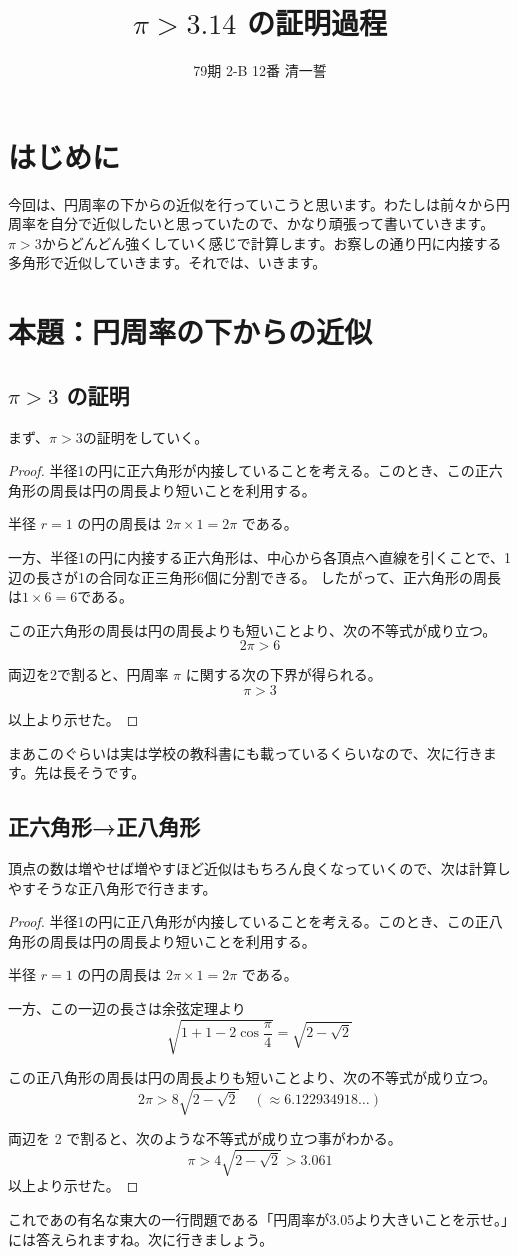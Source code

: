 \documentclass[dvipdfmx]{jlreq}
\title{$\pi > 3.14$ の証明過程}
\author{79期 2-B 12番 \CID{13748}清一誓}
\date{}
\begin{document}
\maketitle
\section{はじめに}
今回は、円周率の下からの近似を行っていこうと思います。わたしは前々から円周率を自分で近似したいと思っていたので、かなり頑張って書いていきます。
$\pi > 3$からどんどん強くしていく感じで計算します。お察しの通り円に内接する多角形で近似していきます。それでは、いきます。
\section{本題：円周率の下からの近似}
\subsection{$\pi > 3$ の証明}
まず、$\pi > 3$の証明をしていく。
\begin{proof}
半径1の円に正六角形が内接していることを考える。このとき、この正六角形の周長は円の周長より短いことを利用する。

半径 $r = 1$ の円の周長は $2\pi \times 1 = 2\pi$ である。

一方、半径1の円に内接する正六角形は、中心から各頂点へ直線を引くことで、1辺の長さが1の合同な正三角形6個に分割できる。
したがって、正六角形の周長は$1 \times 6=6$である。

この正六角形の周長は円の周長よりも短いことより、次の不等式が成り立つ。
\[ 2\pi>6 \]

両辺を2で割ると、円周率 $\pi$ に関する次の下界が得られる。
\[ \pi>3 \]

以上より示せた。
\end{proof}
まあこのぐらいは実は学校の教科書にも載っているくらいなので、次に行きます。先は長そうです。
\subsection{正六角形→正八角形}
頂点の数は増やせば増やすほど近似はもちろん良くなっていくので、次は計算しやすそうな正八角形で行きます。
\begin{proof}
半径1の円に正八角形が内接していることを考える。このとき、この正八角形の周長は円の周長より短いことを利用する。

半径 $r = 1$ の円の周長は $2\pi \times 1 = 2\pi$ である。

一方、この一辺の長さは余弦定理より
\[ \sqrt{1+1-2\cos \frac{\pi}{4}}=\sqrt{2-\sqrt{2}} \]

この正八角形の周長は円の周長よりも短いことより、次の不等式が成り立つ。
\[ 2\pi>8\sqrt{2-\sqrt{2}} \quad (\approx 6.122934918\dots) \]

両辺を 2 で割ると、次のような不等式が成り立つ事がわかる。
\[ \pi>4\sqrt{2-\sqrt{2}}>3.061 \]
以上より示せた。
\end{proof}
これであの有名な東大の一行問題である「円周率が3.05より大きいことを示せ。」には答えられますね。次に行きましょう。
\end{document}
